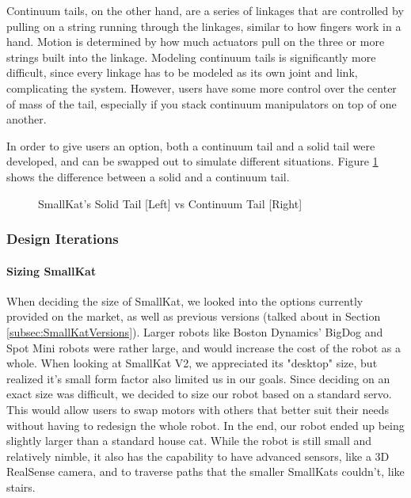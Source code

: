             Continuum tails, on the other hand, are a series of linkages that are controlled by pulling on a string running through the linkages, similar to how fingers work in a hand. Motion is determined by how much actuators pull on the three or more strings built into the linkage. Modeling continuum tails is significantly more difficult, since every linkage has to be modeled as its own joint and link, complicating the system. However, users have some more control over the center of mass of the tail, especially if you stack continuum manipulators on top of one another.

            In order to give users an option, both a continuum tail and a solid tail were developed, and can be swapped out to simulate different situations. Figure \ref{fig:TailComparison} shows the difference between a solid and a continuum tail.
            
            \begin{figure}[H]
                \centering

                \caption{SmallKat's Solid Tail [Left] vs Continuum Tail [Right]}
                \label{fig:TailComparison}
            \end{figure}
        
        
        
        
            
        \subsubsection{Design Iterations} 
         
         
         
         
         \paragraph{Sizing SmallKat}
            When deciding the size of SmallKat, we looked into the options currently provided on the market, as well as previous versions (talked about in Section \ref{subsec:SmallKatVersions}). Larger robots like Boston Dynamics' BigDog and Spot Mini robots were rather large, and would increase the cost of the robot as a whole. When looking at SmallKat V2, we appreciated its "desktop" size, but realized it's small form factor also limited us in our goals. Since deciding on an exact size was difficult, we decided to size our robot based on a standard servo. This would allow users to swap motors with others that better suit their needs without having to redesign the whole robot. In the end, our robot ended up being slightly larger than a standard house cat. While the robot is still small and relatively nimble, it also has the capability to have advanced sensors, like a 3D RealSense camera, and to traverse paths that the smaller SmallKats couldn't, like stairs. 

